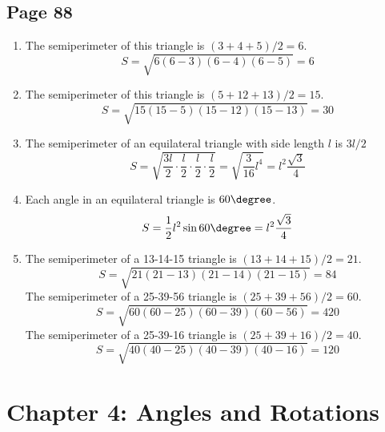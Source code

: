\documentclass{article}
\newenvironment{solutions}[1]
{\subsection*{#1}
 \begin{enumerate}[leftmargin=1.5em]}
{\end{enumerate}}
\newcommand{\solution}{\item}
\begin{document}
\begin{solutions}{Page 88}
\solution %
The semiperimeter of this triangle is $(3+4+5)/2 = 6$.
\[
S = \sqrt{6\left(6-3\right)\left(6-4\right)\left(6-5\right)} = 6
\]
\solution %
The semiperimeter of this triangle is $(5+12+13)/2 = 15$.
\[
S = \sqrt{15\left(15-5\right)\left(15-12\right)\left(15-13\right)} = 30
\]
\solution %
The semiperimeter of an equilateral triangle with side length $l$ is $3l/2$
\[
S = \sqrt{\dfrac{3l}{2} \cdot \dfrac{l}{2} \cdot \dfrac{l}{2} \cdot \dfrac{l}{2}} = \sqrt{\dfrac{3}{16}l^4} = l^2 \dfrac{\sqrt{3}}{4}
\]
\solution %
Each angle in an equilateral triangle is $60\degree$.
\[
S = \dfrac{1}{2}l^2\sin{60\degree} = l^2\dfrac{\sqrt{3}}{4}
\]
\solution %
The semiperimeter of a 13-14-15 triangle is $(13+14+15)/2 = 21$.
\[
S = \sqrt{21\left(21-13\right)\left(21-14\right)\left(21-15\right)} = 84
\]
The semiperimeter of a 25-39-56 triangle is $(25+39+56)/2 = 60$.
\[
S = \sqrt{60\left(60-25\right)\left(60-39\right)\left(60-56\right)} = 420
\]
The semiperimeter of a 25-39-16 triangle is $(25+39+16)/2 = 40$.
\[
S = \sqrt{40\left(40-25\right)\left(40-39\right)\left(40-16\right)} = 120
\]
\end{solutions}

\section*{Chapter 4: Angles and Rotations}
\end{document}
